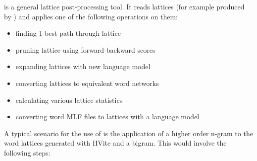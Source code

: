 %
%

\newpage
{}


 is a general lattice post-processing tool. It reads
lattices (for example produced by ) and applies one of
the following operations on them:

\begin{itemize}
\item finding 1-best path through lattice
\item pruning lattice using forward-backward scores
\item expanding lattices with new language model
\item converting lattices to equivalent word networks
\item calculating various lattice statistics
\item converting word MLF files to lattices with a language model
\end{itemize}

A typical scenario for the use of  is the application
of a higher order n-gram to the word lattices generated with HVite and
a bigram. This would involve the following steps:

